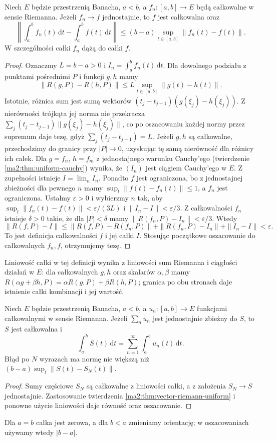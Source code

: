 \begin{twierdzenie}
\label{ma2:thm:vector-riemann-uniform}
Niech $E$ będzie przestrzenią Banacha,
$a<b$, a $f_n:[a,b]\to E$ będą całkowalne
w sensie Riemanna. Jeżeli $f_n\to f$
jednostajnie, to $f$ jest całkowalna oraz
\[
 \left\|\int_a^b f_n(t)\,\mathrm dt-
                 \int_a^b f(t)\,\mathrm dt\right\|
 \le (b-a)\sup_{t\in[a,b]}\|f_n(t)-f(t)\|.
\]
W szczególności całki $f_n$ dążą do całki $f$.
\end{twierdzenie}
\begin{proof}
Oznaczmy $L=b-a>0$ i $I_n=\int_a^b f_n(t)\,\mathrm dt$.
Dla dowolnego podziału z punktami pośrednimi $P$
i funkcji $g,h$ mamy
\[
 \|R(g,P)-R(h,P)\|\le L\sup_{t\in[a,b]}\|g(t)-h(t)\|.
\]
Istotnie, różnica sum jest sumą wektorów
$(t_j-t_{j-1})(g(\xi_j)-h(\xi_j))$.
Z nierówności trójkąta jej norma nie przekracza
$\sum_j(t_j-t_{j-1})\|g(\xi_j)-h(\xi_j)\|$,
co po oszacowaniu każdej normy przez supremum
daje tezę, gdyż $\sum_j(t_j-t_{j-1})=L$.
Jeżeli $g,h$ są całkowalne, przechodzimy do
granicy przy $|P|\to0$, uzyskując tę samą
nierówność dla różnicy ich całek.
Dla $g=f_n$, $h=f_m$ z jednostajnego
warunku Cauchy'ego (twierdzenie
\ref{ma2:thm:uniform-cauchy}) wynika,
że $(I_n)$ jest ciągiem Cauchy'ego w $E$.
Z zupełności istnieje $I=\lim_n I_n$.
Ponadto $f$ jest ograniczona, bo z jednostajnej
zbieżności dla pewnego $n$ mamy
$\sup_t\|f(t)-f_n(t)\|\le1$, a $f_n$ jest ograniczona.
Ustalmy $\varepsilon>0$ i wybierzmy $n$ tak,
aby $\sup_t\|f_n(t)-f(t)\|<\varepsilon/(3L)$
i $\|I_n-I\|<\varepsilon/3$.
Z całkowalności $f_n$ istnieje $\delta>0$
takie, że dla $|P|<\delta$ mamy
$\|R(f_n,P)-I_n\|<\varepsilon/3$.
Wtedy
\[
 \|R(f,P)-I\|
 \le \|R(f,P)-R(f_n,P)\|
    +\|R(f_n,P)-I_n\|+\|I_n-I\|<\varepsilon.
\]
To jest definicja całkowalności $f$ i jej całki $I$.
Stosując początkowe oszacowanie do całkowalnych
$f_n,f$, otrzymujemy tezę.
\end{proof}
Liniowość całki w tej definicji wynika z liniowości
sum Riemanna i ciągłości działań w $E$:
dla całkowalnych $g,h$ oraz skalarów $\alpha,\beta$
mamy $R(\alpha g+\beta h,P)=\alpha R(g,P)+\beta R(h,P)$;
granica po obu stronach daje istnienie całki
kombinacji i jej wartość.

\begin{wniosek}
\label{ma2:cor:termwise-integral}
Niech $E$ będzie przestrzenią Banacha,
$a<b$, a $u_n:[a,b]\to E$ funkcjami całkowalnymi
w sensie Riemanna. Jeżeli $\sum_n u_n$
jest jednostajnie zbieżny do $S$, to $S$
jest całkowalna i
\[
 \int_a^b S(t)\,\mathrm dt
 =\sum_{n=1}^\infty\int_a^b u_n(t)\,\mathrm dt.
\]
Błąd po $N$ wyrazach ma normę nie większą niż
$(b-a)\sup_t\|S(t)-S_N(t)\|$.
\end{wniosek}
\begin{proof}
Sumy częściowe $S_N$ są całkowalne
z liniowości całki, a z założenia $S_N\to S$
jednostajnie. Zastosowanie twierdzenia
\ref{ma2:thm:vector-riemann-uniform} i ponowne
użycie liniowości daje równość oraz oszacowanie.
\end{proof}
Dla $a=b$ całka jest zerowa, a dla $b<a$
zmieniamy orientację; w oszacowaniach
używamy wtedy $|b-a|$.

